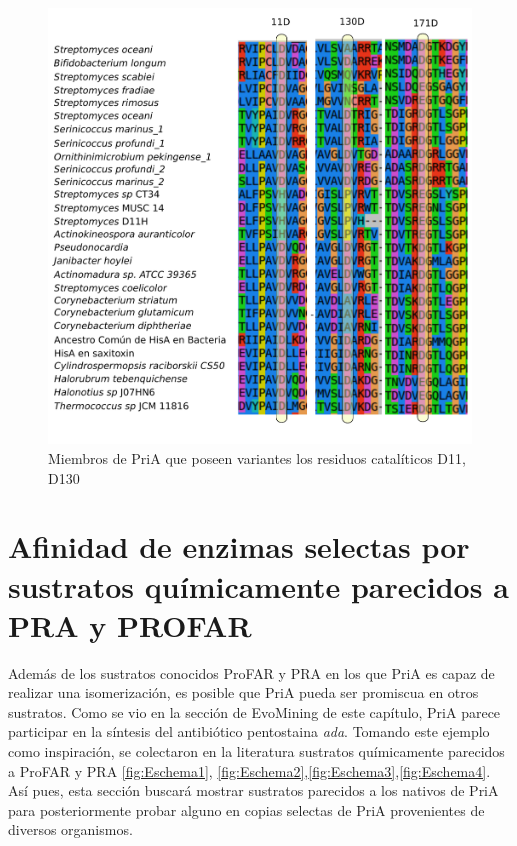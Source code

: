\documentclass[12pt,twoside]{reedthesis}
\begin{document}
  \begin{figure}[h!tbp]
  \centering
  \includegraphics[angle = 0,scale = .8]{chapter4/Couplings/alineamiento.pdf}
  \caption[Miembros de PriA que poseen variantes los residuos catalíticos D11, D130]{\footnotesize{Miembros de PriA que poseen variantes los residuos catalíticos D11, D130}}
  \label{fig:Alineamiento}
  \end{figure}
  
  \clearpage
  
  \section{Afinidad de enzimas selectas por sustratos químicamente
  parecidos a PRA y
  PROFAR}\label{afinidad-de-enzimas-selectas-por-sustratos-quimicamente-parecidos-a-pra-y-profar}
  
  Además de los sustratos conocidos ProFAR y PRA en los que PriA es capaz
  de realizar una isomerización, es posible que PriA pueda ser promiscua
  en otros sustratos. Como se vio en la sección de EvoMining de este
  capítulo, PriA parece participar en la síntesis del antibiótico
  pentostaina \emph{ada}. Tomando este ejemplo como inspiración, se
  colectaron en la literatura sustratos químicamente parecidos a ProFAR y
  PRA \autoref{fig:Eschema1},
  \autoref{fig:Eschema2},\autoref{fig:Eschema3},\autoref{fig:Eschema4}.
  Así pues, esta sección buscará mostrar sustratos parecidos a los nativos
  de PriA para posteriormente probar alguno en copias selectas de PriA
  provenientes de diversos organismos.
  
\end{document}
